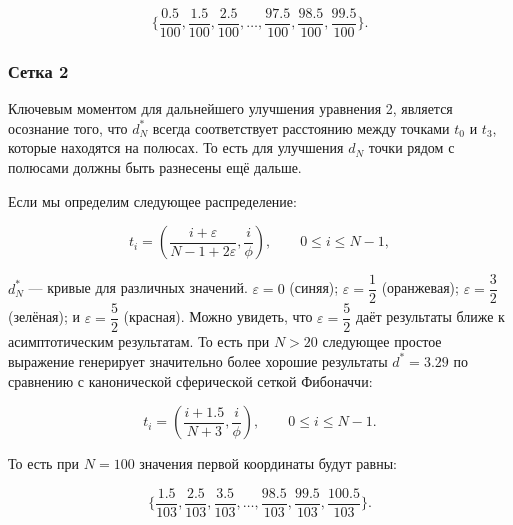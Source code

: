 \documentclass[12pt, a4paper]{article}
\begin{document}
\begin{displaymath}
    \{
        \frac{0.5}{100},
        \frac{1.5}{100},
        \frac{2.5}{100},
        \ldots,
        \frac{97.5}{100},
        \frac{98.5}{100},
        \frac{99.5}{100}
    \}.
\end{displaymath}

\subsubsection*{Сетка 2}

Ключевым моментом для дальнейшего улучшения уравнения 2, является осознание того, что $d^*_N$ всегда соответствует расстоянию между точками $t_0$ и $t_3$, которые находятся на полюсах. То есть для улучшения $d_N$ точки рядом с полюсами должны быть разнесены ещё дальше.

Если мы определим следующее распределение:

\begin{displaymath}
    t_i = \left( \frac{i + \varepsilon}{N - 1 + 2 \varepsilon}, \frac{i}{\phi} \right),
    \qquad
    0 \leq i \leq N-1,
\end{displaymath}

\noindent $d^*_N$ — кривые для различных значений. $\varepsilon=0$ (синяя); $\varepsilon=\dfrac{1}{2}$ (оранжевая); $\varepsilon=\dfrac{3}{2}$ (зелёная); и $\varepsilon=\dfrac{5}{2}$ (красная). Можно увидеть, что $\varepsilon = \dfrac{5}{2}$ даёт результаты ближе к асимптотическим результатам. То есть при $N>20$ следующее простое выражение генерирует значительно более хорошие результаты $d^* = 3.29$ по сравнению с канонической сферической сеткой Фибоначчи:

\begin{displaymath}
    t_i = \left( \frac{i + 1.5}{N + 3}, \frac{i}{\phi} \right),
    \qquad
    0 \leq i \leq N-1.
    \tag{3}
\end{displaymath}

То есть при $N=100$ значения первой координаты будут равны:

\begin{displaymath}
    \{
        \frac{1.5}{103},
        \frac{2.5}{103},
        \frac{3.5}{103},
        \ldots,
        \frac{98.5}{103},
        \frac{99.5}{103},
        \frac{100.5}{103}
    \}.
\end{displaymath}
\end{document}
